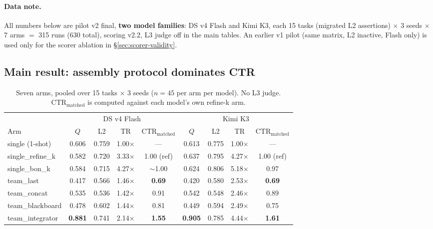 \documentclass{article}
\newcommand{\ctrm}{\mathrm{CTR}_{\text{matched}}}
\begin{document}
\paragraph{Data note.} All numbers below are pilot v2 final, \textbf{two model families}: DS v4 Flash and Kimi K3, each 15 tasks (migrated L2 assertions) $\times$ 3 seeds $\times$ 7 arms $=$ 315 runs (630 total), scoring v2.2, L3 judge off in the main tables. An earlier v1 pilot (same matrix, L2 inactive, Flash only) is used only for the scorer ablation in \S\ref{sec:scorer-validity}.

\subsection{Main result: assembly protocol dominates CTR}
\label{sec:main}

\begin{table}[t]
\centering
\caption{Seven arms, pooled over 15 tasks $\times$ 3 seeds ($n{=}45$ per arm per model). No L3 judge. $\ctrm$ is computed against each model's own refine-k arm.}
\label{tab:main}
\small
\setlength{\tabcolsep}{3.5pt}
\begin{tabular}{lcccc|cccc}
\toprule
& \multicolumn{4}{c|}{DS v4 Flash} & \multicolumn{4}{c}{Kimi K3} \\
Arm & $Q$ & L2 & TR & $\ctrm$ & $Q$ & L2 & TR & $\ctrm$ \\
\midrule
single (1-shot) & 0.606 & 0.759 & 1.00$\times$ & --- & 0.613 & 0.775 & 1.00$\times$ & --- \\
single\_refine\_k & 0.582 & 0.720 & 3.33$\times$ & 1.00 (ref) & 0.637 & 0.795 & 4.27$\times$ & 1.00 (ref) \\
single\_bon\_k & 0.584 & 0.715 & 4.27$\times$ & $\sim$1.00 & 0.624 & 0.806 & 5.18$\times$ & 0.97 \\
team\_last & 0.417 & 0.566 & 1.46$\times$ & \textbf{0.69} & 0.420 & 0.580 & 2.53$\times$ & \textbf{0.69} \\
team\_concat & 0.535 & 0.536 & 1.42$\times$ & 0.91 & 0.542 & 0.548 & 2.46$\times$ & 0.89 \\
team\_blackboard & 0.478 & 0.602 & 1.44$\times$ & 0.81 & 0.449 & 0.594 & 2.49$\times$ & 0.75 \\
team\_integrator & \textbf{0.881} & 0.741 & 2.14$\times$ & \textbf{1.55} & \textbf{0.905} & 0.785 & 4.44$\times$ & \textbf{1.61} \\
\bottomrule
\end{tabular}
\end{table}
\end{document}
